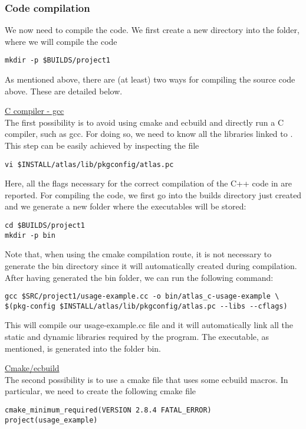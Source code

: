 \subsubsection*{Code compilation}
We now need to compile the code. We first create a new directory
into the  folder, where we will compile the code
%
\begin{lstlisting}[style=BashStyle]
mkdir -p $BUILDS/project1
\end{lstlisting}
%
As mentioned above, there are (at least) two ways for compiling 
the source code above. These are detailed below.
%
\begin{description}
%
\item \underline{C compiler - gcc}\\[0.5em]
%
The first possibility is to 
avoid using cmake and ecbuild and directly run a C compiler, 
such as gcc. For doing so, we need to know all the libraries 
linked to \Atlas. This step can be easily achieved by inspecting 
the file 
%
\begin{lstlisting}[style=BashStyle]
vi $INSTALL/atlas/lib/pkgconfig/atlas.pc
\end{lstlisting}
%
Here, all the flags necessary for the correct compilation 
of the C++ code in  are reported. For 
compiling the code, we first go into the builds directory 
just created and we generate a new folder where the executables 
will be stored: 
%
\begin{lstlisting}[style=BashStyle]
cd $BUILDS/project1
mkdir -p bin
\end{lstlisting}
%
Note that, when using the cmake compilation route, it is not 
necessary to generate the bin directory since it will automatically 
created during compilation.
After having generated the bin folder, we can run the following 
command:
%
\begin{lstlisting}[style=BashStyle]
gcc $SRC/project1/usage-example.cc -o bin/atlas_c-usage-example \ 
$(pkg-config $INSTALL/atlas/lib/pkgconfig/atlas.pc --libs --cflags)
\end{lstlisting}
%
This will compile our usage-example.cc file and it will automatically 
link all the static and dynamic libraries required by the program. 
The executable, as mentioned, is generated into the folder bin.
%
\item \underline{Cmake/ecbuild}\\[0.5em]
%
The second possibility is to use a cmake file that uses some 
ecbuild macros. In particular, we need to create the following 
cmake file
%
\begin{lstlisting}[style=XMLStyle]
cmake_minimum_required(VERSION 2.8.4 FATAL_ERROR)
project(usage_example)


\end{lstlisting}
\end{description}
